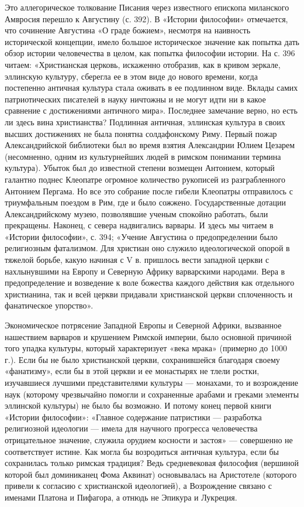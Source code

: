 Это  аллегорическое  толкование   Писания  через  известного  епископа
миланского  Амвросия   перешло  к  Августину  (с.   392).  В  «Истории
философии»  отмечается,  что  сочинение Августина  «О  граде  божием»,
несмотря   на   наивность   исторической  концепции,   имело   большое
историческое значение  как попытка  дать обзор истории  человечества в
целом, как попытка философии истории.  На с. 396 читаем: «Христианская
церковь,  искаженно   отобразив,  как  в  кривом   зеркале,  эллинскую
культуру, сберегла ее в этом  виде до нового времени, когда постепенно
античная  культура стала  оживать в  ее подлинном  виде. Вклады  самих
патриотических писателей в  науку ничтожны и не могут идти  ни в какое
сравнение с  достижениями античного мира». Последнее  замечание верно,
но  есть ли  здесь  вина христианства?  Подлинная античная,  эллинская
культура  в своих  высших  достижениях не  была понятна  солдафонскому
Риму.  Первый пожар  Александрийской  библиотеки был  во время  взятия
Александрии Юлием  Цезарем (несомненно,  одним из  культурнейших людей
в  римском  понимании  термина  культура).  Убыток  был  до  известной
степени возмещен Антонием, который  галантно поднес Клеопатре огромное
количество рукописей  из разграбленного  Антонием Пергама. Но  все это
собрание после  гибели Клеопатры отправилось с  триумфальным поездом в
Рим,  где и  было  сожжено.  Государственные дотации  Александрийскому
музею, позволявшие ученым спокойно работать, были прекращены. Наконец,
с севера надвигались варвары. И здесь мы читаем в «Истории философии»,
с.  394;   «Учение  Августина   о  предопределении   было  религиозным
фатализмом. Для  христиан оно служило идеологической  опорой в тяжелой
борьбе,  какую  начиная  с  V  в. пришлось  вести  западной  церкви  с
нахлынувшими на Европу и Северную  Африку варварскими народами. Вера в
предопределение  и возведение  к  воле божества  каждого действия  как
отдельного  христианина,  так  и всей  церкви  придавали  христианской
церкви сплоченность и фанатическое упорство».

Экономическое потрясение Западной Европы  и Северной Африки, вызванное
нашествием  варваров  и  крушением   Римской  империи,  было  основной
причиной  того упадка  культуры,  который  характеризует «века  мрака»
(примерно  до  1000   г.).  Если  бы  не   было  христианской  церкви,
сохранившейся благодаря  своему «фанатизму», если  бы в этой  церкви и
ее  монастырях не  тлели ростки,  изучавшиеся лучшими  представителями
культуры  --- монахами,  то и  возрождение наук  (которому чрезвычайно
помогли и  сохраненные арабами и греками  элементы эллинской культуры)
не было бы возможно. И  потому конец первой книги «Истории философии»:
«Главное  содержание патристики  --- разработка  религиозной идеологии
--- имела для научного  прогресса человечества отрицательное значение,
служила  орудием косности  и застоя»  --- совершенно  не соответствует
истине.  Как   могла  бы   возродиться  античная  культура,   если  бы
сохранилась  только  римская  традиция? Ведь  средневековая  философия
(вершиной  которой  был  доминиканец  Фома  Аквинат)  основывалась  на
Аристотеле (которого привели к  согласию с христианской идеологией), а
Возрождение связано с именами Платона  и Пифагора, а отнюдь не Эпикура
и Лукреция.

